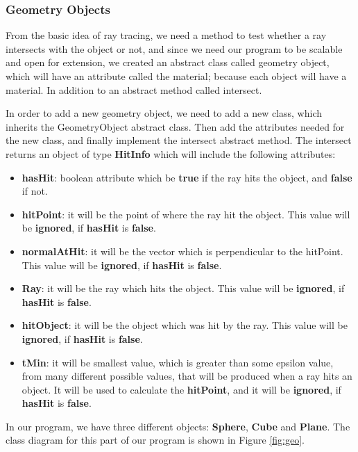 \documentclass[a4paper]{article}
\begin{document}
	\subsubsection{Geometry Objects}
	\label{sssec:geo}
	From the basic idea of ray tracing, we need a method to test whether a ray intersects with the object or not, and since we need our program to be scalable and open for extension, we created an abstract class called geometry object, which will have an attribute called the material; because each object will have a material. In addition to an abstract method called intersect. \\
	\par In order to add a new geometry object, we need to add a new class, which inherits the GeometryObject abstract class. Then add the attributes needed for the new class, and finally implement the intersect abstract method. The intersect returns an object of type \textbf{HitInfo} which will include the following attributes:
	\begin{itemize}
		\item \textbf{hasHit}: boolean attribute which be \textbf{true} if the ray hits the object, and \textbf{false} if not.
		\item \textbf{hitPoint}: it will be the point of where the ray hit the object. This value will be \textbf{ignored}, if \textbf{hasHit} is \textbf{false}.
		\item \textbf{normalAtHit}: it will be the vector which is perpendicular to the hitPoint. This value will be \textbf{ignored}, if \textbf{hasHit} is \textbf{false}.
		\item \textbf{Ray}: it will be the ray which hits the object. This value will be \textbf{ignored}, if \textbf{hasHit} is \textbf{false}.
		\item \textbf{hitObject}: it will be the object which was hit by the ray. This value will be \textbf{ignored}, if \textbf{hasHit} is \textbf{false}.
		\item \textbf{tMin}: it will be smallest value, which is greater than some epsilon value, from many different possible values, that will be produced when a ray hits an object. It will be used to calculate the \textbf{hitPoint}, and it will be \textbf{ignored}, if \textbf{hasHit} is \textbf{false}.
	\end{itemize}
	\par In our program, we have three different objects: \textbf{Sphere}, \textbf{Cube} and \textbf{Plane}. The class diagram for this part of our program is shown in Figure \ref{fig:geo}.
\end{document}

